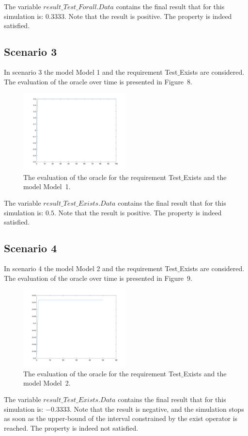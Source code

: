 \documentclass[12pt]{extarticle}
\newcommand{\<}{\langle}
\renewcommand{\>}{\rangle}
\theoremstyle{definition}
\begin{document}
The variable $result\_Test\_Forall.Data$ contains the final result that for this simulation is: $0.3333$.
Note that the result is positive.
The property is indeed satisfied.


\subsection{Scenario 3}
In scenario 3 the model Model 1 and the requirement Test$\_$Exists are considered. 
The evaluation of the oracle over time is presented in Figure~8.

\begin{figure}[h]
\caption{The evaluation of the oracle for the requirement Test$\_$Exists  and the model Model~1.}
  \centering
    \includegraphics[width=0.5\textwidth]{Manual/resModel1TestExists.png}
\end{figure}


The variable  $result\_Test\_Exists.Data$  contains the final result that for this simulation is: $0.5$.
Note that the result is positive. 
The property is indeed satisfied.




\subsection{Scenario 4}
In scenario 4 the model Model 2 and the requirement Test$\_$Exists are considered. 
The evaluation of the oracle over time is presented in Figure~9.

\begin{figure}[h]
\caption{The evaluation of the oracle for the requirement Test$\_$Exists  and the model Model~2.}
  \centering
    \includegraphics[width=0.5\textwidth]{Manual/resModel2TestExists.png}
\end{figure}


The variable  $result\_Test\_Exists.Data$  contains the final result that for this simulation is: $-0.3333$.
Note that the result is negative, and the simulation stops as soon as the upper-bound of the interval constrained by the exist operator is reached.
The property is indeed not satisfied.
\end{document}
